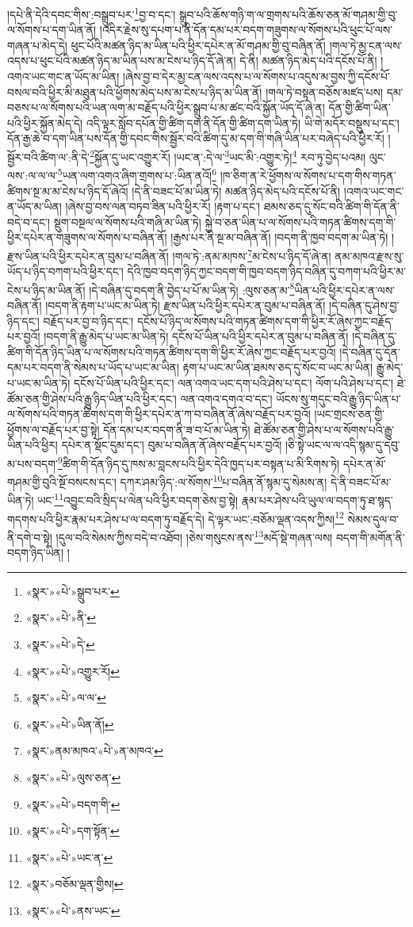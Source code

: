 །དཔེ་ནི་དེའི་དབང་གིས་:བསྒྲུབ་པར་\footnote{«སྣར་»«པེ་»སྒྲུབ་པར་}བྱ་བ་དང་། སྒྲུབ་པའི་ཆོས་གཉི་ག་ལ་གྲགས་པའི་ཆོས་ཅན་མོ་གཤམ་གྱི་བུ་ལ་སོགས་པ་དག་ཡིན་ནོ། །འདིར་རྗེས་སུ་དཔག་པ་ནི་དོན་དམ་པར་བདག་གཟུགས་ལ་སོགས་པའི་ཕུང་པོ་ལས་གཞན་པ་མེད་དེ། ཕུང་པོའི་མཚན་ཉིད་མ་ཡིན་པའི་ཕྱིར་དཔེར་ན་མོ་གཤམ་གྱི་བུ་བཞིན་ནོ། །གལ་ཏེ་མྱ་ངན་ལས་འདས་པ་ཕུང་པོའི་མཚན་ཉིད་མ་ཡིན་པས་མ་ངེས་པ་ཉིད་དོ་ཞེ་ན། དེ་ནི། མཚན་ཉིད་མེད་པའི་དངོས་པོ་ནི། །འགའ་ཡང་གང་ན་ཡོད་མ་ཡིན། །ཞེས་བྱ་བ་དེར་མྱ་ངན་ལས་འདས་པ་ལ་སོགས་པ་འདུས་མ་བྱས་ཀྱི་དངོས་པོ་བསལ་བའི་ཕྱིར་མི་མཐུན་པའི་ཕྱོགས་མེད་པས་མ་ངེས་པ་ཉིད་མ་ཡིན་ནོ། །གལ་ཏེ་བསྟན་བཅོས་མཛད་པས། དམ་བཅས་པ་ལ་སོགས་པའི་ཡན་ལག་མ་བརྗོད་པའི་ཕྱིར་སྒྲུབ་པ་མ་ཚང་བའི་སྐྱོན་ཡོད་དོ་ཞེ་ན། དོན་གྱི་ཚིག་ཡིན་པའི་ཕྱིར་སྐྱོན་མེད་དེ། འདི་ལྟར་སློབ་དཔོན་གྱི་ཚིག་དག་ནི་དོན་གྱི་ཚིག་དག་ཡིན་ཏེ། ཡི་གེ་མདོར་བསྡུས་པ་དང་། དོན་རྒྱ་ཆེ་བ་དག་ཡིན་པས་དོན་གྱི་དབང་གིས་སྦྱོར་བའི་ཚིག་དུ་མ་དག་གི་གཞི་ཡིན་པར་བཞེད་པའི་ཕྱིར་རོ། །སྦྱོར་བའི་ཚིག་ལ་:ནི་དེ་\footnote{«སྣར་»«པེ་»ནི་}སྐྱོན་དུ་ཡང་འགྱུར་རོ། །ཡང་ན་:དེ་ལ་\footnote{«སྣར་»«པེ་»དེ་}ཡང་མི་:འགྱུར་ཏེ།\footnote{«སྣར་»«པེ་»འགྱུར་རོ།} རབ་ཏུ་བྱེད་པའམ། ལུང་ལས་:ལ་ལ་ལ་\footnote{«སྣར་»«པེ་»ལ་ལ་}ཡན་ལག་འགའ་ཞིག་གྲགས་པ་:ཡིན་ནའོ།\footnote{«སྣར་»«པེ་»ཡིན་ནོ།} །ཁ་ཅིག་ན་རེ་ཕྱོགས་ལ་སོགས་པ་དག་གིས་གཏན་ཚིགས་སྔ་མ་མ་ངེས་པ་ཉིད་དོ་ཞེའོ། །དེ་ནི་བཟང་པོ་མ་ཡིན་ཏེ། མཚན་ཉིད་མེད་པའི་དངོས་པོ་ནི། །འགའ་ཡང་གང་ན་ཡོད་མ་ཡིན། །ཞེས་བྱ་བས་ལན་བཏབ་ཟིན་པའི་ཕྱིར་རོ། །རྟག་པ་དང་། ཐམས་ཅད་དུ་སོང་བའི་ཚིག་གི་དོན་ནི་བདེ་བ་དང་། སྡུག་བསྔལ་ལ་སོགས་པའི་གཞི་མ་ཡིན་ཏེ། སྐྱེ་བ་ཅན་ཡིན་པ་ལ་སོགས་པའི་གཏན་ཚིགས་དག་གི་ཕྱིར་དཔེར་ན་གཟུགས་ལ་སོགས་པ་བཞིན་ནོ། །རྒྱས་པར་ནི་སྔ་མ་བཞིན་ནོ། །བདག་ནི་ཁྱབ་བདག་མ་ཡིན་ཏེ། །རྫས་ཡིན་པའི་ཕྱིར་དཔེར་ན་བུམ་པ་བཞིན་ནོ། །གལ་ཏེ་:ནམ་མཁས་\footnote{«སྣར་»ནམ་མཁའ་«པེ་»ན་མཁའ་}མ་ངེས་པ་ཉིད་དོ་ཞེ་ན། ནམ་མཁའ་རྫས་སུ་ཡོད་པ་ཉིད་བཀག་པའི་ཕྱིར་དང་། དེའི་ཁྱབ་བདག་ཉིད་ཀྱང་བདག་གི་ཁྱབ་བདག་ཉིད་བཞིན་དུ་བཀག་པའི་ཕྱིར་མ་ངེས་པ་ཉིད་མ་ཡིན་ནོ། །དེ་བཞིན་དུ་བདག་ནི་བྱེད་པ་པོ་མ་ཡིན་ཏེ། :ལུས་ཅན་མ་\footnote{«སྣར་»«པེ་»ལུས་ཅན་}ཡིན་པའི་ཕྱིར་དཔེར་ན་ལས་བཞིན་ནོ། །བདག་ནི་རྟག་པ་ཡང་མ་ཡིན་ཏེ། རྫས་ཡིན་པའི་ཕྱིར་དཔེར་ན་བུམ་པ་བཞིན་ནོ། །དེ་བཞིན་དུ་ཤེས་བྱ་ཉིད་དང་། བརྗོད་པར་བྱ་བ་ཉིད་དང་། དངོས་པོ་ཉིད་ལ་སོགས་པའི་གཏན་ཚིགས་དག་གི་ཕྱིར་རོ་ཞེས་ཀྱང་བརྗོད་པར་བྱའོ། །བདག་ནི་རྒྱུ་མེད་པ་ཡང་མ་ཡིན་ཏེ། དངོས་པོ་ཡིན་པའི་ཕྱིར་དཔེར་ན་བུམ་པ་བཞིན་ནོ། །དེ་བཞིན་དུ་ཚིག་གི་དོན་ཉིད་ཡིན་པ་ལ་སོགས་པའི་གཏན་ཚིགས་དག་གི་ཕྱིར་རོ་ཞེས་ཀྱང་བརྗོད་པར་བྱའོ། །དེ་བཞིན་དུ་དོན་དམ་པར་བདག་ནི་སེམས་པ་ཡོད་པ་ཡང་མ་ཡིན། རྟག་པ་ཡང་མ་ཡིན་ཐམས་ཅད་དུ་སོང་བ་ཡང་མ་ཡིན། རྒྱུ་མེད་པ་ཡང་མ་ཡིན་ཏེ། དངོས་པོ་ཡིན་པའི་ཕྱིར་དང་། ལན་འགའ་ཡང་དག་པའི་ཤེས་པ་དང་། ལོག་པའི་ཤེས་པ་དང་། ཐེ་ཚོམ་ཅན་གྱི་ཤེས་པའི་རྒྱུ་ཉིད་ཡིན་པའི་ཕྱིར་དང་། ལན་འགའ་དགའ་བ་དང་། ཡོངས་སུ་གདུང་བའི་རྒྱུ་ཉིད་ཡིན་པ་ལ་སོགས་པའི་གཏན་ཚིགས་དག་གི་ཕྱིར་དཔེར་ན་ཀ་བ་བཞིན་ནོ་ཞེས་བརྗོད་པར་བྱའོ། །ཡང་གྲངས་ཅན་གྱི་ཕྱོགས་ལ་བརྗོད་པར་བྱ་སྟེ། དོན་དམ་པར་བདག་ནི་ཟ་བ་པོ་མ་ཡིན་ཏེ། ཐེ་ཚོམ་ཅན་གྱི་ཤེས་པ་ལ་སོགས་པའི་རྒྱུ་ཡིན་པའི་ཕྱིར། དཔེར་ན་སྡོང་དུམ་དང་། བུམ་པ་བཞིན་ནོ་ཞེས་བརྗོད་པར་བྱའོ། །ཅི་སྟེ་ཡང་ལ་ལ་འདི་སྙམ་དུ་དབུ་མ་པས་བདག་\footnote{«སྣར་»«པེ་»བདག་གི་}ཚིག་གི་དོན་ཉིད་དུ་ཁས་མ་བླངས་པའི་ཕྱིར་དེའི་ཁྱད་པར་བསྟན་པ་མི་རིགས་ཏེ། དཔེར་ན་མོ་གཤམ་གྱི་བུའི་སྔོ་བསངས་དང་། དཀར་ཤམ་ཉིད་:ལ་སོགས་\footnote{«སྣར་»«པེ་»དག་སྟོན་}པ་བཞིན་ནོ་སྙམ་དུ་སེམས་ན། དེ་ནི་བཟང་པོ་མ་ཡིན་ཏེ། ཡང་\footnote{«སྣར་»«པེ་»ཡང་ན་}འབྱུང་བའི་སྲིད་པ་ལེན་པའི་ཕྱིར་བདག་ཅེས་བྱ་སྟེ། རྣམ་པར་ཤེས་པའི་ཡུལ་ལ་བདག་ཏུ་ཐ་སྙད་གདགས་པའི་ཕྱིར་རྣམ་པར་ཤེས་པ་ལ་བདག་ཏུ་བརྗོད་དེ། དེ་ལྟར་ཡང་:བཅོམ་ལྡན་འདས་ཀྱིས།\footnote{«སྣར་»བཅོམ་ལྡན་གྱིས།} སེམས་དུལ་བ་ནི་དགེ་བ་སྟེ། །དུལ་བའི་སེམས་ཀྱིས་བདེ་བ་འཐོབ། །ཅེས་གསུངས་ནས་\footnote{«སྣར་»«པེ་»ནས་ཡང་}མདོ་སྡེ་གཞན་ལས། བདག་གི་མགོན་ནི་བདག་ཉིད་ཡིན། །
